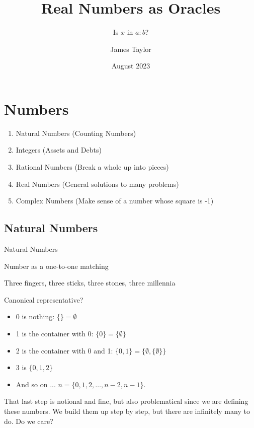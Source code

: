 \documentclass{beamer}
\title[Oracles]{Real Numbers as Oracles}
\subtitle{Is $x$ in $a:b$?}
\author{James Taylor}
\institute{ratmath.com}
\date{August 2023}
\begin{document}
\begin{frame}
\titlepage
\end{frame}


\section{Numbers}

\begin{frame}

\begin{enumerate}
\item Natural Numbers (Counting Numbers)
\item Integers (Assets and Debts)
\item Rational Numbers (Break a whole up into pieces)
\item Real Numbers (General solutions to many problems)
\item Complex Numbers (Make sense of a number whose square is -1)
\end{enumerate}

\end{frame}

\subsection{Natural Numbers}

\begin{frame}{Natural Numbers}

Number as a one-to-one matching

Three fingers, three sticks, three stones, three millennia

Canonical representative?

\pause

\begin{itemize}
    \item 0 is nothing:  $\{\} = \emptyset$
    \item 1 is the container with 0:  $\{0\} = \{\emptyset\}$
    \item 2 is the container with 0 and 1:  $\{0, 1\} = \{ \emptyset,\{\emptyset\} \}$
    \item 3 is $\{0, 1, 2\}$
    \item And so on ... $n = \{0, 1, 2, \ldots, n-2, n-1\}$. 
\end{itemize}

That last step is notional and fine, but also problematical since we are defining these numbers. We build them up step by step, but there are infinitely many to do. Do we care? 

\end{frame}
\end{document}
